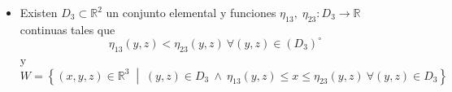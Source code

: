 \begin{itemize}
    \item Existen $D_3 \subset \mathbb{R}^2$ un conjunto elemental y funciones $\eta_{13},\; \eta_{23}: D_3\to\mathbb{R}$ continuas tales que 
    $$\eta_{13}(y, z) < \eta_{23}(y, z) \: \forall (y,z) \in (D_3)^{\circ}$$ 
    y 
    \begin{equation}
        \label{def_conj_elem_R3_t3} 
        W = \left\{ (x, y, z) \in \mathbb{R}^3 \;\middle|\; (y,z) \in D_3 \: \land \: \eta_{13}(y, z) \leq x \leq \eta_{23}(y, z) \: \forall (y,z) \in D_3 \right\} 
    \end{equation}
\end{itemize}
\begin{figure}[htbp]
    \centering
     
    \label{fig:Conjunto tipo 3}
\end{figure}



\newpage

